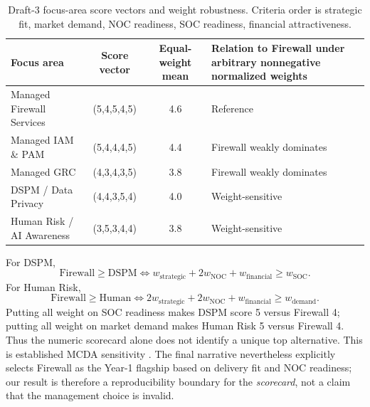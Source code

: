 \documentclass[systems,article,submit,moreauthors]{Definitions/mdpi}
\begin{document}
\begin{table}[H]
\centering
\small
\caption{Draft-3 focus-area score vectors and weight robustness. Criteria order is strategic fit, market demand, NOC readiness, SOC readiness, financial attractiveness.}
\label{tab:score}
\begin{tabularx}{\linewidth}{X c c X}
\toprule
Focus area & Score vector & Equal-weight mean & Relation to Firewall under arbitrary nonnegative normalized weights \\
\midrule
Managed Firewall Services & (5,4,5,4,5) & 4.6 & Reference \\
Managed IAM \& PAM & (5,4,4,4,5) & 4.4 & Firewall weakly dominates \\
Managed GRC & (4,3,4,3,5) & 3.8 & Firewall weakly dominates \\
DSPM / Data Privacy & (4,4,3,5,4) & 4.0 & Weight-sensitive \\
Human Risk / AI Awareness & (3,5,3,4,4) & 3.8 & Weight-sensitive \\
\bottomrule
\end{tabularx}
\end{table}

For DSPM,
\[
\mathrm{Firewall}\ge\mathrm{DSPM}
\iff
w_{\mathrm{strategic}}+2w_{\mathrm{NOC}}+w_{\mathrm{financial}}
\ge w_{\mathrm{SOC}}.
\]
For Human Risk,
\[
\mathrm{Firewall}\ge\mathrm{Human}
\iff
2w_{\mathrm{strategic}}+2w_{\mathrm{NOC}}+w_{\mathrm{financial}}
\ge w_{\mathrm{demand}}.
\]
Putting all weight on SOC readiness makes DSPM score 5 versus Firewall 4; putting all weight on market demand makes Human Risk 5 versus Firewall 4. Thus the numeric scorecard alone does not identify a unique top alternative. This is established MCDA sensitivity \cite{Maliene2018}. The final narrative nevertheless explicitly selects Firewall as the Year-1 flagship based on delivery fit and NOC readiness; our result is therefore a reproducibility boundary for the \emph{scorecard}, not a claim that the management choice is invalid.
\end{document}
